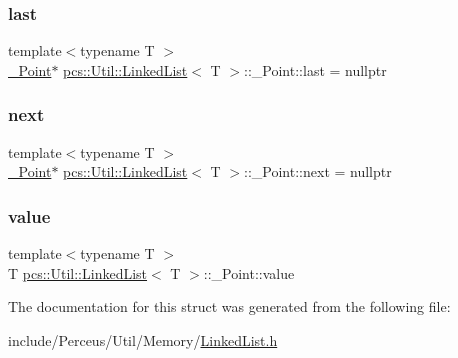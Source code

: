 \subsubsection{\texorpdfstring{last}{last}}
{\footnotesize\ttfamily template$<$typename T $>$ \\
\hyperlink{structpcs_1_1Util_1_1LinkedList_1_1__Point}{\+\_\+\+Point}$\ast$ \hyperlink{classpcs_1_1Util_1_1LinkedList}{pcs\+::\+Util\+::\+Linked\+List}$<$ T $>$\+::\+\_\+\+Point\+::last = nullptr}

\mbox{\label{structpcs_1_1Util_1_1LinkedList_1_1__Point_ac6608e428bffcb2943d80aa962692cc4}} 
\subsubsection{\texorpdfstring{next}{next}}
{\footnotesize\ttfamily template$<$typename T $>$ \\
\hyperlink{structpcs_1_1Util_1_1LinkedList_1_1__Point}{\+\_\+\+Point}$\ast$ \hyperlink{classpcs_1_1Util_1_1LinkedList}{pcs\+::\+Util\+::\+Linked\+List}$<$ T $>$\+::\+\_\+\+Point\+::next = nullptr}

\mbox{\label{structpcs_1_1Util_1_1LinkedList_1_1__Point_a2006e59eae181a2923dd28c3720c91d0}} 
\subsubsection{\texorpdfstring{value}{value}}
{\footnotesize\ttfamily template$<$typename T $>$ \\
T \hyperlink{classpcs_1_1Util_1_1LinkedList}{pcs\+::\+Util\+::\+Linked\+List}$<$ T $>$\+::\+\_\+\+Point\+::value}



The documentation for this struct was generated from the following file\+:\begin{DoxyCompactItemize}
\item 
include/\+Perceus/\+Util/\+Memory/\hyperlink{LinkedList_8h}{Linked\+List.\+h}\end{DoxyCompactItemize}
